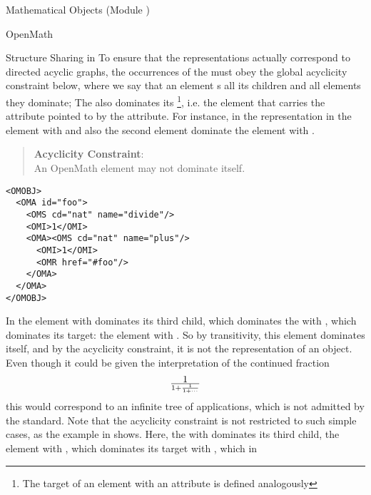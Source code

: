 \begin{tchapter}[id=mobj,short=Mathematical Objects]{Mathematical Objects (Module {})}
\begin{tsection}[id=openmath]{OpenMath}
\begin{tsubsection}[id=om:structure-sharing]{Structure Sharing in {\openmath}}
To ensure that the {\xml} representations actually correspond to directed
acyclic graphs, the occurrences of the
{} must obey the global acyclicity constraint below, where we say
that an {\openmath} element {s} all its children and all elements they
dominate; The {} also dominates its {}\footnote{The
  target of an {\openmath} element with an {} attribute is defined analogously}, i.e. the element that carries the
{} attribute pointed to by the
{} attribute.  For instance, in the representation in
{} the {} element with {}
and also the second {} element dominate the
{} element with {}.
\begin{quote}
  {\bf {\openmath} Acyclicity Constraint}:\\
  An OpenMath element may not dominate itself.
\end{quote}
\begin{lstlisting}[language=OpenMath,numbers=none,label=lst:chained-fraction,
  caption={A Simple Cycle},
  index={OMOBJ,OMA,OMV}]
<OMOBJ>
  <OMA id="foo">
    <OMS cd="nat" name="divide"/>
    <OMI>1</OMI>
    <OMA><OMS cd="nat" name="plus"/>
      <OMI>1</OMI>
      <OMR href="#foo"/>
    </OMA> 
  </OMA>
</OMOBJ>
\end{lstlisting}
In {} the {} element with {}
dominates its third child, which dominates the {} with
{}, which dominates its target: the {} element
with {}. So by transitivity, this element dominates itself, and by
the acyclicity constraint, it is not the {\xml} representation of an {\openmath}
object.  Even though it could be given the interpretation of the continued
fraction
\[1\over{1 + {1\over {1+\cdots}}}\] this would correspond to an infinite tree of
applications, which is not admitted by the {\openmath} standard. Note that the acyclicity
constraint is not restricted to such simple cases, as the example in {}
shows.  Here, the {} with {} dominates its
third child, the {} element with {}, which
dominates its target {} with {}, which in

\end{tsubsection}
\end{tsection}
\end{tchapter}
